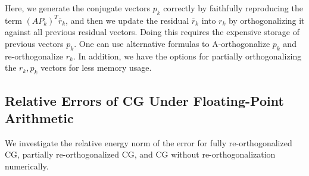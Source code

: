 \documentclass[]{article}
\theoremstyle{definition}
\begin{document}
        Here, we generate the conjugate vectors $p_k$ correctly by faithfully reproducing the term $(AP_k)^T\overline{r}_k$, and then we update the residual $\overline{r}_k$ into $r_k$ by orthogonalizing it against all previous residual vectors. Doing this requires the expensive storage of previous vectors $p_k$. One can use alternative formulas to A-orthogonalize $p_k$ and re-orthogonalize $r_k$. In addition, we have the options for partially orthogonalizing the $r_k, p_k$ vectors for less memory usage. 
    \subsection{Relative Errors of CG Under Floating-Point Arithmetic}
        We investigate the relative energy norm of the error for fully re-orthogonalized CG, partially re-orthogonalized CG, and CG without re-orthogonalization numerically. 
\end{document}
